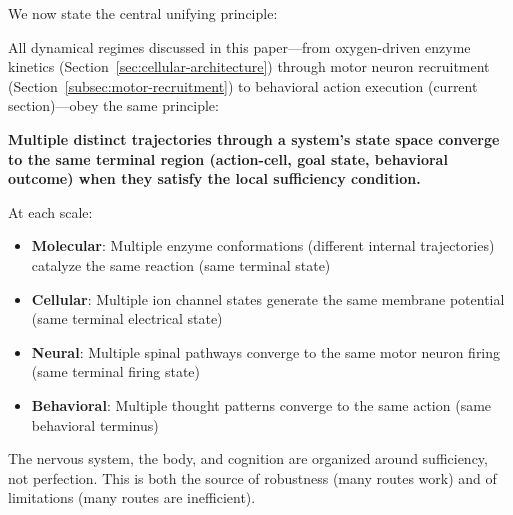 We now state the central unifying principle:

\begin{principle}
\label{prin:universal-sufficiency}
All dynamical regimes discussed in this paper---from oxygen-driven enzyme kinetics (Section~\ref{sec:cellular-architecture}) through motor neuron recruitment (Section~\ref{subsec:motor-recruitment}) to behavioral action execution (current section)---obey the same principle:

\textbf{Multiple distinct trajectories through a system's state space converge to the same terminal region (action-cell, goal state, behavioral outcome) when they satisfy the local sufficiency condition.}

At each scale:
\begin{itemize}[noitemsep]
\item \textbf{Molecular}: Multiple enzyme conformations (different internal trajectories) catalyze the same reaction (same terminal state)
\item \textbf{Cellular}: Multiple ion channel states generate the same membrane potential (same terminal electrical state)
\item \textbf{Neural}: Multiple spinal pathways converge to the same motor neuron firing (same terminal firing state)
\item \textbf{Behavioral}: Multiple thought patterns converge to the same action (same behavioral terminus)
\end{itemize}

The nervous system, the body, and cognition are organized around sufficiency, not perfection. This is both the source of robustness (many routes work) and of limitations (many routes are inefficient).
\end{principle}

